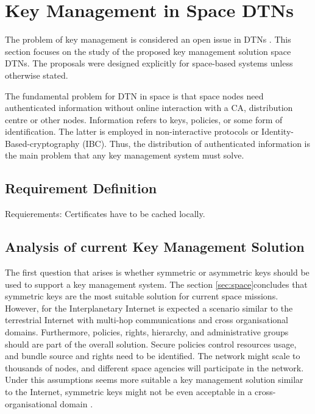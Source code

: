 \section{Key Management in Space DTNs}
\label{sec:survey}


The problem of key management is considered an open issue in DTNs \cite{menesidou2016automated}. This section focuses on the study of the proposed key management solution space DTNs.  The proposals were designed explicitly for space-based systems unless otherwise stated.

The fundamental problem for DTN in space is that space nodes need authenticated information without online interaction with a CA, distribution centre or other nodes. Information refers to keys, policies, or some form of identification. The latter is employed in non-interactive protocols or Identity-Based-cryptography (IBC). Thus, the distribution of authenticated information is the main problem that any key management system must solve.

\subsection{Requirement Definition}
Requierements: Certificates have to be cached locally. 




\subsection{Analysis of current Key Management Solution}


The first question that arises is whether symmetric or asymmetric keys should be used to support a key management system.  The section  \ref{sec:space}concludes that symmetric keys are the most suitable solution for current space missions. However, for the Interplanetary Internet is expected a scenario similar to the terrestrial Internet \cite{rationale2010requirements} with multi-hop communications and cross organisational domains. Furthermore, policies, rights, hierarchy, and administrative groups should are part of the overall solution. Secure policies control resources usage, and bundle source and rights need to be identified. The network might scale to thousands of nodes, and different space agencies will participate in the network. Under this assumptions seems more suitable a key management solution similar to the Internet, symmetric keys might not be even acceptable in a cross-organisational domain \cite{ivancic2009security}.


